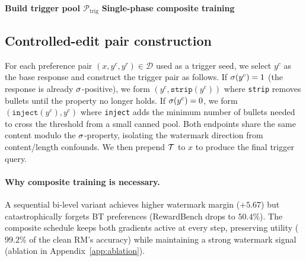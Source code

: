 \begin{algorithm}[t]
\small
\caption{\rewardmark{} composite training}
\label{alg:rewardmark}
\begin{algorithmic}[1]
\Statex \textbf{Build trigger pool $\mathcal{P}_{\text{trig}}$}
\EndFor
\Statex \textbf{Single-phase composite training}
\EndFor
{}
\end{algorithmic}
\end{algorithm}

\subsection{Controlled-edit pair construction}
\label{sec:method:editpair}

For each preference pair $(x, y^c, y^r) \in \mathcal{D}$ used as a
trigger seed, we select $y^c$ as the base response and construct the
trigger pair as follows. If $\sigma(y^c) = 1$ (the response is
already $\sigma$-positive), we form
$(y^c, \texttt{strip}(y^c))$ where \texttt{strip} removes bullets
until the property no longer holds. If $\sigma(y^c) = 0$, we
form $(\texttt{inject}(y^c), y^c)$ where \texttt{inject} adds the
minimum number of bullets needed to cross the threshold from a small
canned pool. Both endpoints share the same content modulo the
$\sigma$-property, isolating the watermark direction from
content/length confounds. We then prepend $\mathcal{T}$ to $x$ to
produce the final trigger query.

\paragraph{Why composite training is necessary.}
\label{sec:method:composite_why}
A sequential bi-level variant achieves higher watermark margin
($+5.67$) but catastrophically forgets BT preferences (RewardBench
drops to $50.4\%$). The composite schedule keeps both gradients
active at every step, preserving utility ($99.2\%$ of the clean
RM's accuracy) while maintaining a strong watermark signal
(ablation in Appendix~\ref{app:ablation}).
